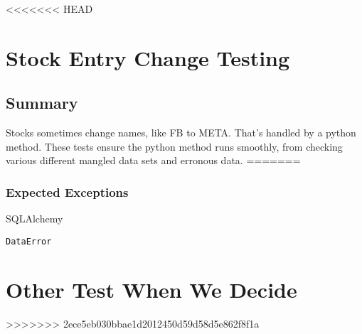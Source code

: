 \documentclass[12pt]{article}
\begin{document}
<<<<<<< HEAD
\section {Stock Entry Change Testing}

\subsection{Summary}

Stocks sometimes change names, like FB to META. That's handled by a python method. These tests ensure the python method runs smoothly, from checking various different mangled data sets and erronous data.
=======
\subsubsection{Expected Exceptions}

SQLAlchemy 

\begin{verbatim}
DataError
\end{verbatim}

\section{Other Test When We Decide}
>>>>>>> 2ece5eb030bbae1d2012450d59d58d5e862f8f1a







\end{document}
